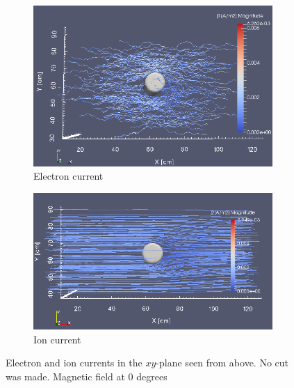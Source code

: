 \documentclass[twoside]{article}
\begin{document}
\begin{figure}[H]
\centering
\begin{subfigure}{.5\textwidth}
  \centering
  \includegraphics[width=\linewidth]{zoom/j1_Z(zoom).png}
  \caption{Electron current}
  \label{fig:sub101}
\end{subfigure}%
\begin{subfigure}{.5\textwidth}
  \centering
  \includegraphics[width=\linewidth]{zoom/j2_Z(zoom).png}
  \caption{Ion current}
  \label{fig:sub102}
\end{subfigure}
\caption{Electron and ion currents in the $xy$-plane seen from above. No cut was made. Magnetic field at 0 degrees}
\label{fig:10}
\end{figure}
\end{document}
